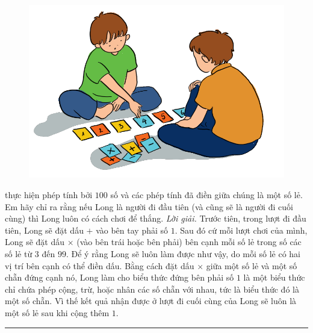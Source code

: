 \begin{multicols}{2}
	\begin{figure}[H]
		\centering
		\vspace*{-5pt}
		\captionsetup{labelformat= empty, justification=centering}
		\includegraphics[width=0.7\linewidth]{Pi9_bai6}
		\vspace*{-5pt}
	\end{figure}
	 thực hiện phép tính bởi $100$ số và các phép tính đã điền giữa chúng là một số lẻ. Em hãy chỉ ra rằng nếu Long là người đi đầu tiên (và cũng sẽ là người đi cuối cùng) thì Long luôn có cách chơi để thắng.
	\vskip 0.1cm
	\textit{Lời giải.} 	Trước tiên, trong lượt đi đầu tiên, Long sẽ đặt dấu $+$ vào bên tay phải số $1$. Sau đó cứ mỗi lượt chơi của mình, Long sẽ đặt dấu $\times$ (vào bên trái hoặc bên phải) bên cạnh mỗi số lẻ trong số các số lẻ từ $3$ đến $99$. Để ý rằng Long sẽ luôn làm được như vậy, do mỗi số lẻ có hai vị trí bên cạnh có thể điền dấu. Bằng cách đặt dấu $\times$ giữa một số lẻ và một số chẵn đứng cạnh nó, Long làm cho biểu thức đứng bên phải số $1$ là một biểu thức chỉ chứa phép cộng, trừ, hoặc nhân các số chẵn với nhau, tức là biểu thức đó là một số chẵn. Vì thế kết quả nhận được ở lượt đi cuối cùng của Long sẽ luôn là một số lẻ sau khi cộng thêm $1$. 
\end{multicols}
\vspace*{-10pt}
{\color{toancuabi}\rule{1\linewidth}{0.1pt}}
